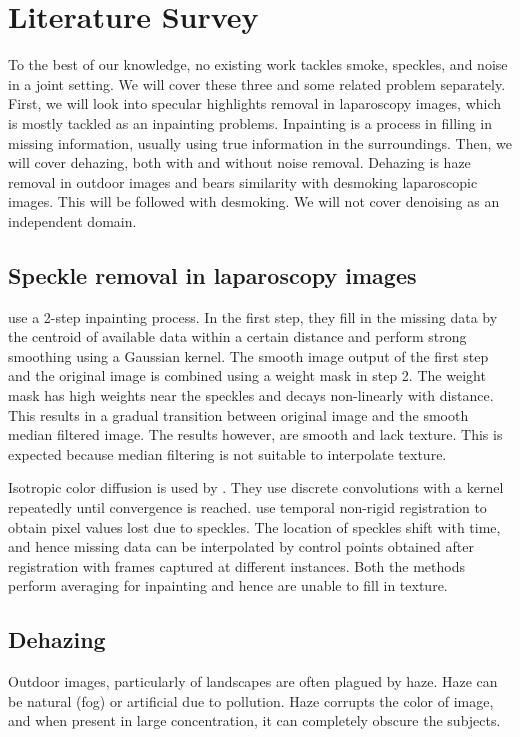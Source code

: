 
\chapter{Literature Survey}

To the best of our knowledge, no existing work tackles smoke, speckles, and noise in a joint setting. We will cover these three and some related problem separately. First, we will look into specular highlights removal in laparoscopy images, which is mostly tackled as an inpainting problems. Inpainting is a process in filling in missing information, usually using true information in the surroundings. Then, we will cover dehazing, both with and without noise removal. Dehazing is haze removal in outdoor images and bears similarity with desmoking laparoscopic images. This will be followed with desmoking. We will not cover denoising as an independent domain.

\section{Speckle removal in laparoscopy images}
\cite{arnold2010speckle} use a 2-step inpainting process. In the first step, they fill in the missing data by the centroid of available data within a certain distance and perform strong smoothing using a Gaussian kernel. The smooth image output of the first step and the original image is combined using a weight mask in step 2. The weight mask has high weights near the speckles and decays non-linearly with distance. This results in a gradual transition between original image and the smooth median filtered image. The results however, are smooth and lack texture. This is expected because median filtering is not suitable to interpolate texture.

Isotropic color diffusion is used by \cite{saint2011detection}. They use discrete convolutions with a kernel repeatedly until convergence is reached. \cite{stoyanov2005removing} use temporal non-rigid registration to obtain pixel values lost due to speckles. The location of speckles shift with time, and hence missing data can be interpolated by control points obtained after registration with frames captured at different instances. Both the methods perform averaging for inpainting and hence are unable to fill in texture.

\section{Dehazing}
Outdoor images, particularly of landscapes are often plagued by haze. Haze can be natural (fog) or artificial due to pollution. Haze corrupts the color of image, and when present in large concentration, it can completely obscure the subjects.


